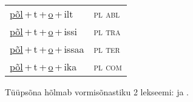 \begin{minipage}{\textwidth}
\begin{sideways}
\begin{tabular}{l l}
\underline{põl}\,+\,t\,+\,\underline{o}\,+\,ilt & \textsc{ pl abl } \\
\underline{põl}\,+\,t\,+\,\underline{o}\,+\,issi & \textsc{ pl tra } \\
\underline{põl}\,+\,t\,+\,\underline{o}\,+\,issaa & \textsc{ pl ter } \\
\underline{põl}\,+\,t\,+\,\underline{o}\,+\,ika & \textsc{ pl com } \\
\end{tabular}
\end{sideways}
\label{tab:tüüpsõnamall-põlto}

\end{minipage}

 
\vspace{1em}
\noindent Tüüpsõna hõlmab vormisõnastiku 2 lekseemi:  ja .
